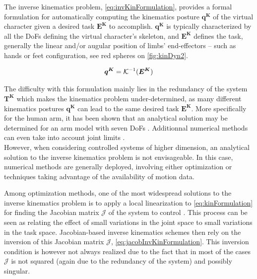 				\label{subsubsubsec:CA_MC_Kinematics_Inv}

The inverse kinematics problem, \myequname \eqref{eq:invKinFormulation}, provides a formal formulation for automatically computing the kinematics posture $\boldsymbol{q^K}$ of the virtual character given a desired task $\boldsymbol{E^K}$ to accomplish. $\boldsymbol{q^K}$ is typically characterized by all the DoFs defining the virtual character's skeleton, and $\boldsymbol{E^K}$ defines the task, generally the linear and/or augular position of limbs' end-effectors -- such as hands or feet configuration, see red spheres on \myfigname \ref{fig:kinDyn2}.

\begin{equation}
	\boldsymbol{q^K} = \mathcal{K}^{-1}(\boldsymbol{E^K})
\label{eq:invKinFormulation}
\eqcaption{Inverse kinematics formulation}
\end{equation}

The difficulty with this formulation mainly lies in the redundancy of the system $\boldsymbol{T^K}$ which makes the kinematics problem under-determined, as many different kinematics postures $\boldsymbol{q^K}$ can lead to the same desired task $\boldsymbol{E^K}$. More specifically for the human arm, it has been shown that an analytical solution may be determined for an arm model with seven DoFs . Additionnal numerical methods can even take into account joint limits .\\

However, when considering controlled systems of higher dimension, an analytical solution to the inverse kinematics problem is not envisageable. In this case, numerical methods are generally deployed, involving either optimization or techniques taking advantage of the availability of motion data.


					\label{subsubsubsubsec:CA_MC_Kinematics_Inv_Jacobian}

Among optimization methods, one of the most widespread solutions to the inverse kinematics problem is to apply a local linearization to \myequname \eqref{eq:kinFormulation} for finding the Jacobian matrix $\mathcal{J}$ of the system to control . This process can be seen as relating the effect of small variations in the joint space to small variations in the task space. Jacobian-based inverse kinematics schemes then rely on the inversion of this Jacobian matrix $\mathcal{J}$, \myequname \eqref{eq:jacobInvKinFormulation}. This inversion condition is however not always realized due to the fact that in most of the cases $\mathcal{J}$ is not squared (again due to the redundancy of the system) and possibly singular.

